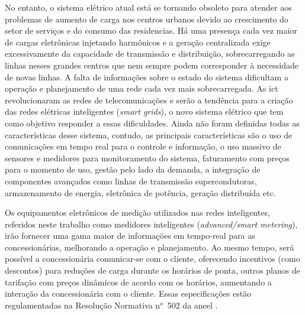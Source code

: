 No entanto, o sistema elétrico atual está se tornando obsoleto para atender aos problemas de 
aumento de carga nos centros urbanos devido ao crescimento do setor 
de serviços e do consumo das residencias. Há uma presença cada vez maior
de cargas eletrônicas injetando harmônicos e a geração centralizada exige 
excessivamente da capacidade de transmissão e distribuição, 
sobrecarregando as linhas nesses grandes centros que nem sempre podem 
corresponder à necessidade de novas linhas. A falta de informações sobre o 
estado do sistema dificultam a operação e planejamento de uma rede cada vez mais 
sobrecarregada. As \gls{ict} revolucionaram as redes de telecomunicações e 
serão a tendência para a criação das redes elétricas inteligentes (\emph{smart 
grids}), o novo sistema elétrico que tem como objetivo responder a essas
dificuldades. Ainda não foram definidas todas as características desse sistema,
contudo, as principais características são o uso de comunicações em tempo real
para o controle e informação, o uso massivo de sensores e medidores para
monitoramento do sistema, faturamento com preços para o momento de uso, 
gestão pelo lado da demanda, a integração de 
componentes avançados como linhas de transmissão supercondutoras,
armazenamento de energia, eletrônica de potência, geração distribuída
etc.  \cite{dissert_caires,aceee_2010_estudos_feedback}

Os equipamentos eletrônicos de medição utilizados nas redes inteligentes,
referidos neste trabalho como medidores inteligentes
(\emph{advanced/smart metering}), irão fornecer uma gama maior de
informações em tempo-real para as concessionárias, melhorando a
operação e planejamento. Ao mesmo tempo, será possível a
concessionária comunicar-se com o cliente, oferecendo incentivos (como
descontos) para reduções de carga durante os horários de ponta, outros
planos de tarifação com preços dinâmicos de acordo com os horários,
aumentando a interação da concessionária com o cliente. Essas
especificações estão regulamentadas na Resolução Normativa n$^o$~502
da \gls{aneel} \cite{ren502}.

